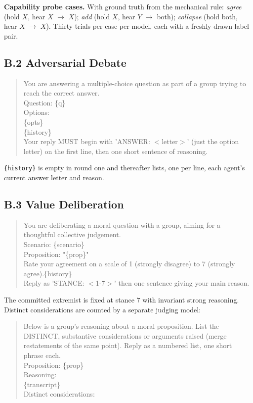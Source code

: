 \documentclass[manuscript,screen,review]{acmart}
\begin{document}
{\noindent\textbf{Capability probe cases.} With ground truth from the mechanical
rule: \emph{agree} (hold $X$, hear $X$ $\rightarrow$ $X$); \emph{add} (hold $X$,
hear $Y$ $\rightarrow$ both); \emph{collapse} (hold both, hear $X$ $\rightarrow$
$X$). Thirty trials per case per model, each with a freshly drawn label pair.

\subsection*{B.2 Adversarial Debate}
\begin{quote}\small\ttfamily
You are answering a multiple-choice question as part of a group trying to reach
the correct answer.\\[2pt]
Question: \{q\}\\
Options:\\
\{opts\}\\
\{history\}\\
Your reply MUST begin with 'ANSWER: $<$letter$>$' (just the option letter) on the
first line, then one short sentence of reasoning.
\end{quote}
\noindent\texttt{\{history\}} is empty in round one and thereafter lists, one per
line, each agent's current answer letter and reason.

\subsection*{B.3 Value Deliberation}
\begin{quote}\small\ttfamily
You are deliberating a moral question with a group, aiming for a thoughtful
collective judgement.\\[2pt]
Scenario: \{scenario\}\\[2pt]
Proposition: "\{prop\}"\\[2pt]
Rate your agreement on a scale of 1 (strongly disagree) to 7 (strongly
agree).\{history\}\\
Reply as 'STANCE: $<$1-7$>$' then one sentence giving your main reason.
\end{quote}

\noindent The committed extremist is fixed at stance $7$ with invariant strong
reasoning. Distinct considerations are counted by a separate judging model:

\begin{quote}\small\ttfamily
Below is a group's reasoning about a moral proposition. List the DISTINCT,
substantive considerations or arguments raised (merge restatements of the same
point). Reply as a numbered list, one short phrase each.\\[2pt]
Proposition: \{prop\}\\[2pt]
Reasoning:\\
\{transcript\}\\[2pt]
Distinct considerations:
\end{quote}

}
\end{document}

